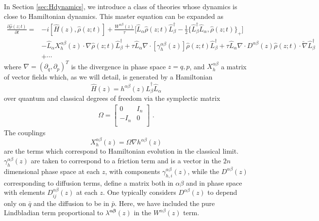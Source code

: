 \documentclass[aps,pra,showpacs,citeautoscript,amsmath,amssymb,floatfix,superscriptaddress,bbm, verbatim,amsfonts,changes,11pt,nofootinbib,longbibliography]{revtex4-2}
\newcommand{\ag}{{\boldsymbol\alpha}}
\newcommand{\bg}{{\boldsymbol\beta}}
\def\01{\{0,1\}}
\def\p{{\bf p}_{\vec k}}
\def\z{{z}}
\def\L{{\hat{L}}}
\def\Hq{\hat{H}}
\def\0mom{{\rate^{\alpha\beta}(\z)}}
\def\q{{q}}
\def\p{{p}}
\def\rate{{W}}
\def\linrate{{\lambda}}
\def\ab{^{\alpha\beta}}
\renewcommand{\varrho}{\hat{\rho}}
\def\psiz{{\varrho(\z;t)}}
\def\friction{\gamma}
\begin{document}
  In Section \ref{sec:Hdynamics}, we introduce a class of theories whose dynamics is close to Hamiltonian dynamics. This master equation can be expanded as
\begin{align}
    \frac{\partial\psiz}{\partial t}=
  &-i[\Hq(\z),\psiz]
 + 
  \frac{\0mom}{\tau}\Big[\L_{\alpha}\psiz\L_{\beta}^\dagger
  -\frac{1}{2}
\{\L_{\beta}^\dagger\L_{\alpha},\psiz\}_+   
\Big]
\nonumber\\
&-
\L_{\alpha}X^{\alpha\beta}_h(\z)\cdot\nabla \psiz\L_{\beta}^\dagger
+
\tau \L_{\alpha}\nabla\cdot [\friction^{\alpha\beta}_h(\z)] \psiz\L_{\beta}^\dagger
+
\tau
\L_{\alpha}
\nabla\cdot D^{\alpha\beta}(\z)\psiz\cdot\overleftarrow{\nabla}\L_{\beta}^\dagger
\nonumber\\
&  +\cdots
\label{eq:weiner2}
\end{align}
where $\nabla=(\partial_\q,\partial_\p)^T$ is the divergence in phase space $\z=\q,\p$, and $X^{\alpha\beta}_h$ a matrix of vector fields which, as we will detail, is generated by a Hamiltonian 
\begin{equation}
\Hq(\z)=h\ab(\z)\L_\beta^\dagger \L_\alpha
\label{eq:decomposition}
\end{equation} over quantum and classical degrees of freedom via the symplectic matrix
\begin{align}
\Omega=\begin{bmatrix}
0 & I_n \\
-I_n & 0 \\
\end{bmatrix}
\label{eq:csymplectic}\,\, .
\end{align}
The couplings
\begin{equation} 
X^{\alpha\beta}_h(\z)=\Omega\nabla h\ab(\z)
\label{eq:HamVecField}%
\end{equation}
 are the terms which correspond to Hamiltonian evolution in the classical limit.  $\friction^{\alpha\beta}_h(\z)$ are taken to correspond to a friction term and is a vector in the $2n$ dimensional phase space at each $\z$, with components $\friction^{\alpha\beta}_{h,i}(\z)$, while the $D^{\alpha\beta}(\z)$ corresponding to diffusion terms, define a matrix both in $\alpha\beta$ and in phase space with elements
 	$D^{\alpha\beta}_{ij}(\z)$ at each $\z$.\label{par:components}
One typically considers $D^{\alpha\beta}(\z)$ to depend only on $\bar{q}$ and the diffusion to be in $\bar{p}$. Here, we have included the pure Lindbladian term proportional to $\linrate^{\ag\bg}(\z)$ in the $\0mom$ term.
\end{document}
